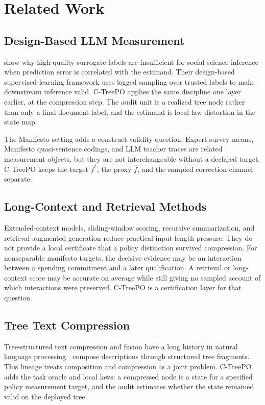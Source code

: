 \section{Related Work}\label{sec:v8-scope-related}

\subsection{Design-Based LLM Measurement}

\citet{EgamiEtAl2024} show why high-quality surrogate labels are insufficient
for social-science inference when prediction error is correlated with the
estimand. Their design-based supervised-learning framework uses logged
sampling over trusted labels to make downstream inference valid. C-TreePO
applies the same discipline one layer earlier, at the compression step. The
audit unit is a realized tree node rather than only a final document label,
and the estimand is local-law distortion in the state map.

The Manifesto setting adds a construct-validity question. Expert-survey means,
Manifesto quasi-sentence codings, and LLM teacher traces are related
measurement objects, but they are not interchangeable without a declared
target. C-TreePO keeps the target \(f^\ast\), the proxy \(\widehat f\), and
the sampled correction channel separate.

\subsection{Long-Context and Retrieval Methods}

Extended-context models, sliding-window scoring, recursive summarization, and
retrieval-augmented generation reduce practical input-length pressure. They do
not provide a local certificate that a policy distinction survived
compression. For nonseparable manifesto targets, the decisive evidence may be
an interaction between a spending commitment and a later qualification. A
retrieval or long-context score may be accurate on average while still giving
no sampled account of which interactions were preserved. C-TreePO is a
certification layer for that question.

\subsection{Tree Text Compression}

Tree-structured text compression and fusion have a long history in natural
language processing \citep{KnightMarcu2000SentenceCompression,BarzilayMcKeown2005SentenceFusion,ClarkeLapata2008ILPSentenceCompression}.
\citet{KuznetsovaEtAl2014TreeTalk} compose descriptions through structured
tree fragments. This lineage treats composition and compression as a joint
problem. C-TreePO adds the task oracle and local laws: a compressed node is a
state for a specified policy measurement target, and the audit estimates
whether the state remained valid on the deployed tree.

